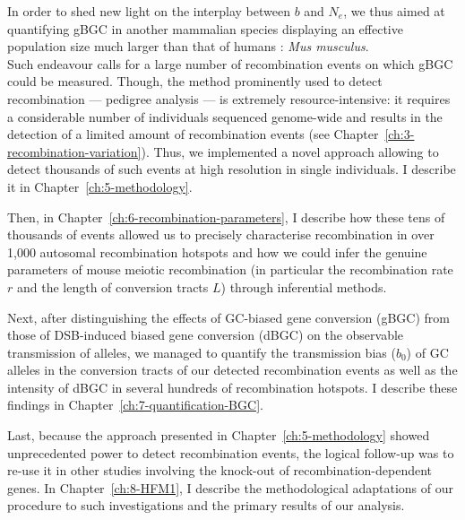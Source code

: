 
In order to shed new light on the interplay between $b$ and $N_e$, we thus aimed at quantifying gBGC in another mammalian species displaying an effective population size much larger than that of humans \citep{geraldes2008inferring,phifer-rixey2012adaptive,davies2015factors}: \textit{Mus musculus}.\\

Such endeavour calls for a large number of recombination events on which gBGC could be measured. 
Though, the method prominently used to detect recombination — pedigree analysis — is extremely resource-intensive: it requires a considerable number of individuals sequenced genome-wide and results in the detection of a limited amount of recombination events (see Chapter~\ref{ch:3-recombination-variation}).
Thus, we implemented a novel approach allowing to detect thousands of such events at high resolution in single individuals. I describe it in Chapter~\ref{ch:5-methodology}.

Then, in Chapter~\ref{ch:6-recombination-parameters}, I describe how these tens of thousands of events allowed us to precisely characterise recombination in over 1,000 autosomal recombination hotspots and how we could infer the genuine parameters of mouse meiotic recombination (in particular the recombination rate $r$ and the length of conversion tracts $L$) through inferential methods.

Next, after distinguishing the effects of GC-biased gene conversion (gBGC) from those of DSB-induced biased gene conversion (dBGC) on the observable transmission of alleles, we managed to quantify the transmission bias ($b_0$) of GC alleles in the conversion tracts of our detected recombination events as well as the intensity of dBGC in several hundreds of recombination hotspots. 
I describe these findings in Chapter~\ref{ch:7-quantification-BGC}.

Last, because the approach presented in Chapter~\ref{ch:5-methodology} showed unprecedented power to detect recombination events, the logical follow-up was to re-use it in other studies involving the knock-out of recombination-dependent genes.
In Chapter~\ref{ch:8-HFM1}, I describe the methodological adaptations of our procedure to such investigations and the primary results of our analysis.

